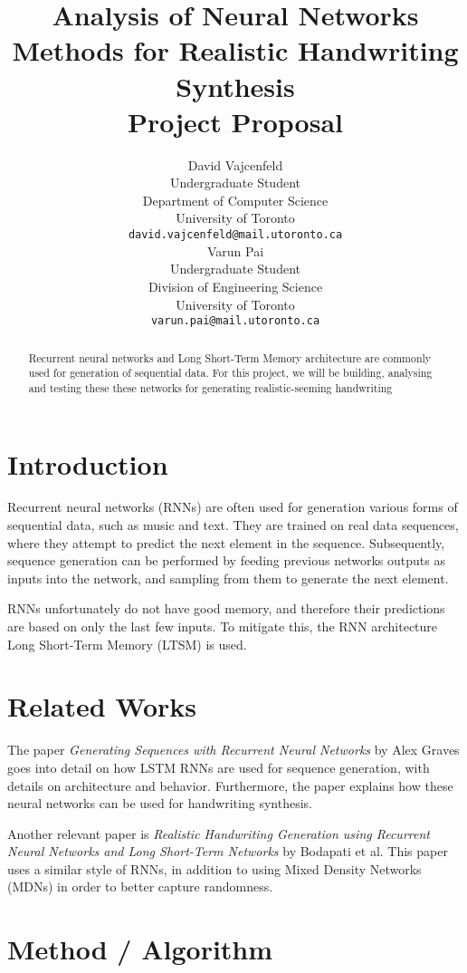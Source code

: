 \documentclass{article}
\title{Analysis of Neural Networks Methods for Realistic Handwriting Synthesis \\\medskip \Large Project Proposal}
\author{%
  David Vajcenfeld\\
  Undergraduate Student \\
  Department of Computer Science\\
  University of Toronto \\
  \texttt{david.vajcenfeld@mail.utoronto.ca} \\
   \And
  Varun Pai\\
  Undergraduate Student \\
  Division of Engineering Science \\
  University of Toronto \\
  \texttt{varun.pai@mail.utoronto.ca}
}
\begin{document}
\maketitle

\begin{abstract}
Recurrent neural networks and Long Short-Term Memory architecture are commonly used
for generation of sequential data.
For this project, we will be building, analysing and testing these these networks for generating realistic-seeming
handwriting
\end{abstract}

\section{Introduction}

Recurrent neural networks (RNNs) are often used for generation various forms of sequential data, such as music and text.
They are trained on real data sequences, where they
attempt to predict the next element in the sequence.
Subsequently, sequence generation can be performed
by feeding previous networks outputs as inputs into the network,
and sampling from them to generate the next element.

RNNs unfortunately do not have good memory, and therefore their
predictions are based on only the last few inputs.
To mitigate this, the RNN architecture Long Short-Term Memory (LTSM)
is used.

\section{Related Works}

The paper \textit{Generating Sequences with Recurrent Neural Networks}
by Alex Graves goes into detail on how LSTM RNNs are used for sequence generation,
with details on architecture and behavior.
Furthermore, the paper explains how these neural networks
can be used for handwriting synthesis. \cite{graves}

Another relevant paper is \textit{Realistic Handwriting Generation using
Recurrent Neural Networks and Long Short-Term Networks} by Bodapati et al.
This paper uses a similar style of RNNs, in addition to using Mixed Density Networks (MDNs)
in order to better capture randomness. \cite{bodapti}

\section{Method / Algorithm}
\end{document}
